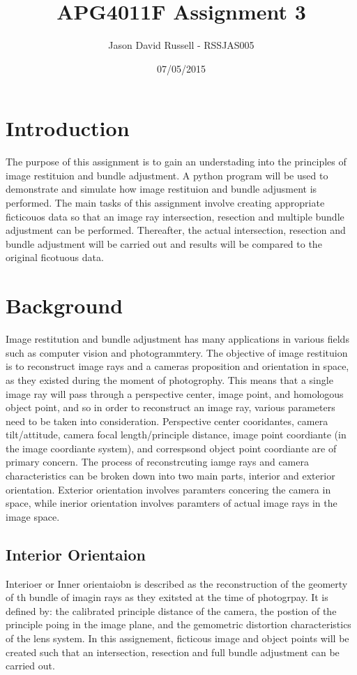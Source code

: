 \documentclass{article}
\title{APG4011F Assignment 3}
\date{07/05/2015}
\author{Jason David Russell - RSSJAS005}
\begin{document}
\maketitle
{}

\newpage
\tableofcontents


\newpage
\section{Introduction}
The purpose of this assignment is to gain an understading into the principles of image restituion and bundle adjustment.
A python program will be used to demonstrate and simulate how image restituion and bundle adjusment is performed.
The main tasks of this assignment involve creating appropriate ficticouos data so that an image ray intersection, resection
and multiple bundle adjustment can be performed. Thereafter, the actual intersection, resection and bundle adjustment will
be carried out and results will be compared to the original ficotuous data.


\section{Background}
Image restitution and bundle adjustment has many applications in various fields such as computer vision and photogrammtery.
The objective of image restituion is to reconstruct image rays and a cameras proposition and orientation in space, as they existed during the moment of photogrophy.
This means that a single image ray will pass through a perspective center, image point, and homologous object point, and so
in order to reconstruct an image ray, various parameters need to be taken into consideration.
Perspective center cooridantes, camera tilt/attitude, camera focal length/principle distance, image point coordiante (in the
image coordiante system), and correspsond object point coordiante are of primary concern.
The process of reconstrcuting iamge rays and camera characteristics can be broken down into two main parts, interior and exterior orientation.
Exterior orientation involves paramters concering the camera in space, while inerior orientation involves paramters of actual image rays in the
image space.

\newpage

\subsection{Interior Orientaion}
Interioer or Inner orientaiobn is described as the reconstruction of the geomerty of th bundle of imagin rays as they exitsted at the time
of photogrpay. It is defined by: the calibrated principle distance of the camera, the postion of the principle poing in the image plane,
and the gemometric distortion characteristics of the lens system.
In this assignement, ficticous image and object points will be created such that an intersection, resection and full bundle adjustment
can be carried out.
\end{document}
